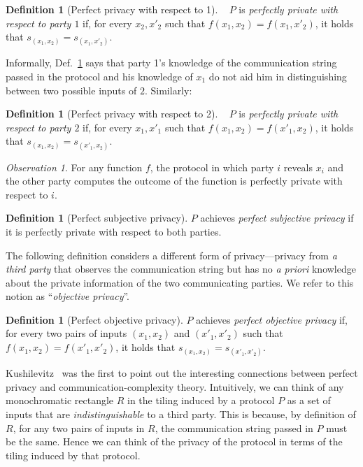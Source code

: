 \documentclass{article}
\theoremstyle{theorem}
\theoremstyle{definition}
\newtheorem{definition}[theorem]{Definition}
\theoremstyle{remark}
\newtheorem{obs}[theorem]{Observation}
\begin{document}
\begin{definition} [Perfect privacy with respect to 1]~\cite{CK91,K92} \label{def_ppwrt1}
$P$ is \emph{perfectly private with respect to party $1$} if, for
every $x_2,x'_2$ such that $f(x_1,x_2)=f(x_1,x'_2)$, it holds that
$s_{(x_1,x_2)}=s_{(x_1,x'_2)}$.
\end{definition}

Informally, Def.~\ref{def_ppwrt1} says that party 1's knowledge of the communication
string passed in the protocol and his knowledge of $x_1$ do not
aid him in distinguishing between two possible inputs of $2$.
Similarly:
\begin{definition}[Perfect privacy with respect to 2]~\cite{CK91,K92}
$P$ is \emph{perfectly private with respect to party $2$} if, for
every $x_1,x'_1$ such that $f(x_1,x_2)=f(x'_1,x_2)$, it holds that
$s_{(x_1,x_2)}=s_{(x'_1,x_2)}$.
\end{definition}

\begin{obs}
For any function $f$, the protocol in which party $i$ reveals $x_i$
and the other party computes the outcome of the function is
perfectly private with respect to $i$.
\end{obs}

\begin{definition} [Perfect subjective privacy]
$P$ achieves \emph{perfect subjective privacy} if it is perfectly
private with respect to both parties.
\end{definition}

The following definition considers a different form of privacy---privacy from \emph{a third party} that observes the communication
string but has no \emph{a priori} knowledge about the private
information of the two communicating parties. We refer to this
notion as ``\emph{objective privacy}''.

\begin{definition} [Perfect objective privacy]
$P$ achieves \emph{perfect objective privacy} if, for every two
pairs of inputs $(x_1,x_2)$ and $(x'_1,x'_2)$ such that
$f(x_1,x_2)=f(x'_1,x'_2)$, it holds that
$s_{(x_1,x_2)}=s_{(x'_1,x'_2)}$.
\end{definition}

Kushilevitz~\cite{K92} was the first to point out the interesting
connections between perfect privacy and communication-complexity theory. Intuitively, we can think of any monochromatic
rectangle $R$ in the tiling induced by a protocol $P$ as a set of
inputs that are \emph{indistinguishable} to a third party. This is
because, by definition of $R$, for any two pairs of inputs in $R$, the
communication string passed in $P$ must be the same. Hence we can
think of the privacy of the protocol in terms of the tiling induced
by that protocol.
\end{document}
